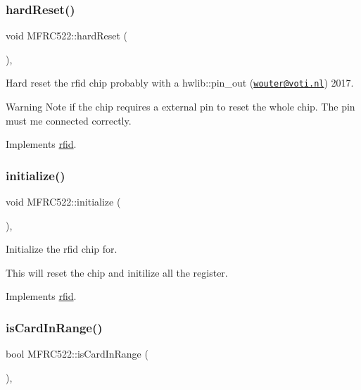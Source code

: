 \subsubsection{\texorpdfstring{hard\+Reset()}{hardReset()}}
{\footnotesize\ttfamily void M\+F\+R\+C522\+::hard\+Reset (\begin{DoxyParamCaption}{ }\end{DoxyParamCaption})\hspace{0.3cm}{\ttfamily [override]}, {\ttfamily [virtual]}}



Hard reset the rfid chip probably with a hwlib\+::pin\+\_\+out (\href{mailto:wouter@voti.nl}{\tt wouter@voti.\+nl}) 2017. 

\begin{DoxyWarning}{Warning}
Note if the chip requires a external pin to reset the whole chip. The pin must me connected correctly. 
\end{DoxyWarning}


Implements \mbox{\hyperlink{classrfid_a7f993197e5aa12e7b3bfb1576552bbf1}{rfid}}.

\mbox{\label{class_m_f_r_c522_a5f589b09eaf150551b369052ce125fa1}} 
\subsubsection{\texorpdfstring{initialize()}{initialize()}}
{\footnotesize\ttfamily void M\+F\+R\+C522\+::initialize (\begin{DoxyParamCaption}{ }\end{DoxyParamCaption})\hspace{0.3cm}{\ttfamily [override]}, {\ttfamily [virtual]}}



Initialize the rfid chip for. 

This will reset the chip and initilize all the register. 

Implements \mbox{\hyperlink{classrfid_a76f857b77fbea6776048aab6ba835a29}{rfid}}.

\mbox{\label{class_m_f_r_c522_a019f76569bddf9c2f9f94eca13a618d7}} 
\subsubsection{\texorpdfstring{is\+Card\+In\+Range()}{isCardInRange()}}
{\footnotesize\ttfamily bool M\+F\+R\+C522\+::is\+Card\+In\+Range (\begin{DoxyParamCaption}{ }\end{DoxyParamCaption})\hspace{0.3cm}{\ttfamily [override]}, {\ttfamily [virtual]}}



